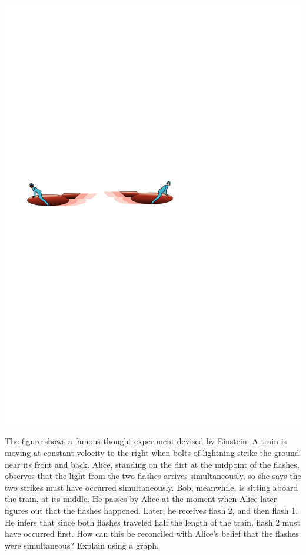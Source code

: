 \includegraphics{../share/relativity/figs/spaceships-opposite-directions}

\begin{dq}
The figure shows a famous thought experiment devised by Einstein. A train is moving at
constant velocity to the right when bolts of lightning strike the ground near its front and
back. Alice, standing on the dirt at the midpoint of the flashes, observes that the light
from the two flashes arrives simultaneously, so she says the two strikes must have occurred
simultaneously. Bob, meanwhile, is sitting aboard the train, at its middle. 
He passes by Alice at the moment when Alice later figures out that the flashes happened.
Later, he receives flash 2, and then flash 1. He infers that since both flashes traveled
half the length of the train, flash 2 must have occurred first.
How can this be reconciled with Alice's belief that the flashes were simultaneous?
Explain using a graph.
\end{dq}

